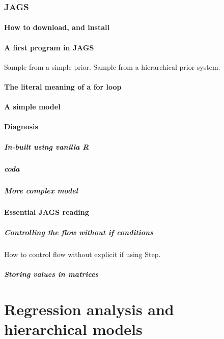 \documentclass[11pt,fullpage]{book}
\begin{document}
\section{JAGS}
\subsection{How to download, and install}
\subsection{A first program in JAGS}
Sample from a simple prior. Sample from a hierarchical prior system.
\subsection{The literal meaning of a for loop}
\subsection{A simple model}
\subsection{Diagnosis}
\subsubsection{In-built using vanilla R}
\subsubsection{coda}
\subsubsection{More complex model}

\subsection{Essential JAGS reading}
\subsubsection{Controlling the flow without if conditions}
How to control flow without explicit if using Step.
\subsubsection{Storing values in matrices}


\part{Regression analysis and hierarchical models}\label{part:regressionHierarchical}
\end{document}
